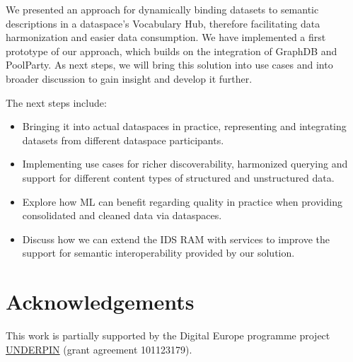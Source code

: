 \documentclass[
  super,
  preprint,
  3p]{elsarticle}
\providecommand{\tightlist}{%
  \setlength{\itemsep}{0pt}\setlength{\parskip}{0pt}}\usepackage{longtable,booktabs,array}
\begin{document}
We presented an approach for dynamically binding datasets to semantic
descriptions in a dataspace's Vocabulary Hub, therefore facilitating
data harmonization and easier data consumption. We have implemented a
first prototype of our approach, which builds on the integration of
GraphDB and PoolParty. As next steps, we will bring this solution into
use cases and into broader discussion to gain insight and develop it
further.

The next steps include:

\begin{itemize}
\tightlist
\item
  Bringing it into actual dataspaces in practice, representing and
  integrating datasets from different dataspace participants.
\item
  Implementing use cases for richer discoverability, harmonized querying
  and support for different content types of structured and unstructured
  data.
\item
  Explore how ML can benefit regarding quality in practice when
  providing consolidated and cleaned data via dataspaces.
\item
  Discuss how we can extend the IDS RAM with services to improve the
  support for semantic interoperability provided by our solution.
\end{itemize}

\section{Acknowledgements}\label{acknowledgements}

This work is partially supported by the Digital Europe programme project
\href{https://underpinproject.eu/}{UNDERPIN} (grant agreement
101123179).


\renewcommand\refname{References}
  
\end{document}
